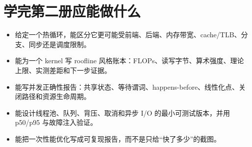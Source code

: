 \section*{学完第二册应能做什么}

\begin{rubricbox}
\begin{itemize}
  \item 给定一个热循环，能区分它更可能受前端、后端、内存带宽、cache/TLB、分支、同步还是调度限制。
  \item 能为一个 kernel 写 roofline 风格账本：FLOPs、读写字节、算术强度、理论上限、实测差距和下一步证据。
  \item 能写并发正确性报告：共享状态、等待谓词、happens-before、线性化点、关闭路径和资源生命周期。
  \item 能设计线程池、队列、背压、取消和异步 I/O 的最小可测试版本，并用 p50/p95 与故障注入验证。
  \item 能把一次性能优化写成可复现报告，而不是只给“快了多少”的截图。
\end{itemize}
\end{rubricbox}
